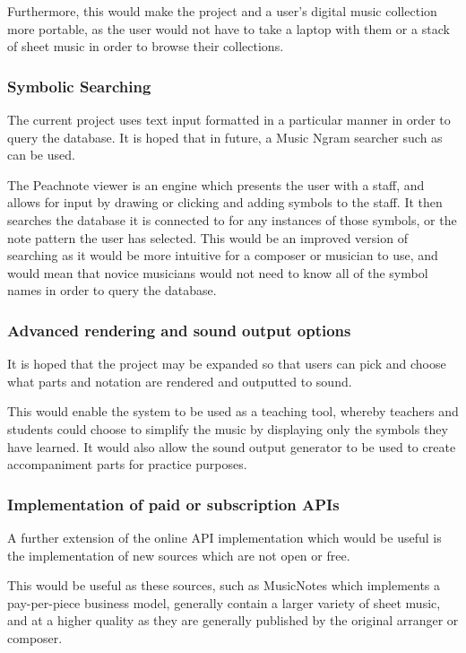 Furthermore, this would make the project and a user's digital music collection more portable, as the user would not have to take a laptop with them or a stack of sheet music in order to browse their collections.

\subsubsection{Symbolic Searching}
The current project uses text input formatted in a particular manner in order to query the database. It is hoped that in future, a Music Ngram searcher such as \cite{Peachnote} can be used. 

The Peachnote viewer is an engine which presents the user with a staff, and allows for input by drawing or clicking and adding symbols to the staff. It then searches the database it is connected to for any instances of those symbols, or the note pattern the user has selected. This would be an improved version of searching as it would be more intuitive for a composer or musician to use, and would mean that novice musicians would not need to know all of the symbol names in order to query the database.


\subsubsection{Advanced rendering and sound output options}
It is hoped that the project may be expanded so that users can pick and choose what parts and notation are rendered and outputted to sound. 

This would enable the system to be used as a teaching tool, whereby teachers and students could choose to simplify the music by displaying only the symbols they have learned. It would also allow the sound output generator to be used to create accompaniment parts for practice purposes.

\subsubsection{Implementation of paid or subscription APIs}
A further extension of the online API implementation which would be useful is the implementation of new sources which are not open or free. 

This would be useful as these sources, such as MusicNotes which implements a pay-per-piece business model, generally contain a larger variety of sheet music, and at a higher quality as they are generally published by the original arranger or composer.

